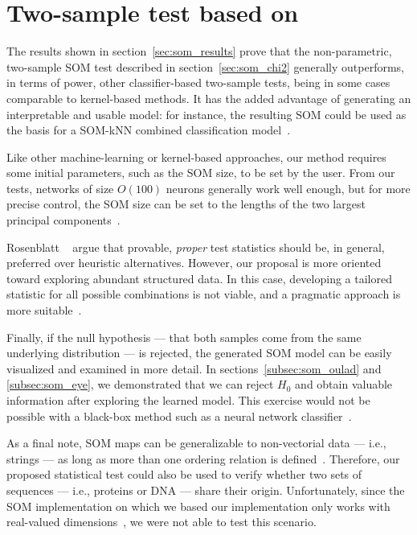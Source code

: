 \section{Two-sample test based on }
\label{sec:discuss_som}
The results shown in section~\ref{sec:som_results} prove that the non-parametric,
two-sample \gls{SOM} test described in section~\ref{sec:som_chi2} generally outperforms,
in terms of power, other classifier-based two-sample tests, being in some cases
comparable to kernel-based methods. It has the added advantage of generating an
interpretable and usable model: for instance, the resulting \gls{SOM} could be used
as the basis for a \gls{SOM}-\gls{kNN} combined classification model~\cite{silva2011som}.

Like other machine-learning or kernel-based approaches, our method requires some
initial parameters, such as the \gls{SOM} size, to be set by the user. From our
tests, networks of size $O(100)$ neurons generally work well enough, but for more
precise control, the \gls{SOM} size can be set to the lengths of the two largest
principal components~\cite{KOHONEN201352}.

Rosenblatt \etal~\cite{rosenblatt2019better} argue that provable, \emph{proper} test statistics
should be, in general, preferred over heuristic alternatives. However, our
proposal is more oriented toward exploring abundant structured data. In this
case, developing a tailored statistic for all possible combinations is not viable,
and a pragmatic approach is more suitable~\cite{kim2021classification}.

Finally, if the null hypothesis --- that both samples come from the same underlying
distribution --- is rejected, the generated \gls{SOM}  model can be easily visualized
and examined in more detail.
In sections~\ref{subsec:som_oulad} and \ref{subsec:som_eye}, we demonstrated
that we can reject $H_0$ and obtain valuable information after exploring the learned model.
This exercise would not be possible with a black-box method such as
a neural network classifier~\cite{friedman2004multivariate}.

As a final note, \gls{SOM} maps can be generalizable to non-vectorial data
--- i.e., strings --- as long as more than one ordering relation is
defined~\cite{kohonen1982self, KOHONEN201352}.
Therefore, our proposed statistical test could also be used to verify whether
two sets of sequences --- i.e., proteins or DNA --- share their origin.
Unfortunately, since the \gls{SOM} implementation on which we based our implementation
only works with real-valued dimensions~\cite{wittek_somoclu_2017}, we were not
able to test this scenario.


